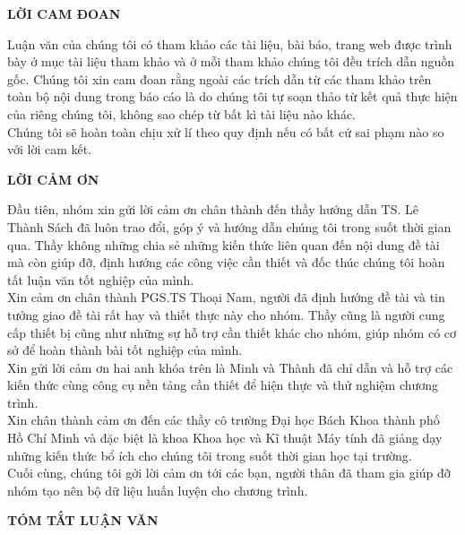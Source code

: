 \documentclass[a4paper]{report}
\begin{document}
\thispagestyle{empty}

\newpage
\begin{center}
	\textbf{LỜI CAM ĐOAN}
\end{center}

Luận văn của chúng tôi có tham khảo các tài liệu, bài báo, trang web được trình bày ở
mục tài liệu tham khảo và ở mỗi tham khảo chúng tôi đều trích dẫn nguồn gốc. Chúng tôi
xin cam đoan rằng ngoài các trích dẫn từ các tham khảo trên toàn bộ nội dung trong báo cáo
là do chúng tôi tự soạn thảo từ kết quả thực hiện của riêng chúng tôi, không sao chép từ
bất kì tài liệu nào khác.\\

Chúng tôi sẽ hoàn toàn chịu xử lí theo quy định nếu có bất cứ sai phạm nào so với lời
cam kết.

\newpage 
\begin{center}
	\textbf{LỜI CẢM ƠN}
\end{center}

Đầu tiên, nhóm xin gửi lời cảm ơn chân thành đến thầy hướng dẫn TS. Lê Thành Sách
đã luôn trao đổi, góp ý và hướng dẫn chúng tôi trong suốt thời gian qua. Thầy không những
chia sẻ những kiến thức liên quan đến nội dung đề tài mà còn giúp đỡ, định hướng các công 
việc cần thiết và đốc thúc chúng tôi hoàn tất luận văn tốt nghiệp của mình.\\

Xin cảm ơn chân thành PGS.TS Thoại Nam, người đã định hướng đề tài và tin tưởng giao đề 
tài rất hay và thiết thực này cho nhóm. Thầy cũng là người cung cấp thiết bị cũng như 
những sự hỗ trợ cần thiết khác cho nhóm, giúp nhóm có cơ sở để hoàn thành bài tốt nghiệp
 của mình. \\

Xin gửi lời cảm ơn hai anh khóa trên là Minh và Thành  đã chỉ dẫn và hỗ trợ các kiến thức
cùng công cụ nền tảng cần thiết để hiện thực và thử nghiệm chương trình.\\

Xin chân thành cảm ơn đến các thầy cô trường Đại học Bách Khoa thành phố Hồ Chí
Minh và đặc biệt là khoa Khoa học và Kĩ thuật Máy tính đã giảng dạy những kiến thức bổ
ích cho chúng tôi trong suốt thời gian học tại trường.\\

Cuối cùng, chúng tôi gởi lời cảm ơn tới các bạn, người thân đã tham gia giúp đỡ nhóm tạo
nên bộ dữ liệu huấn luyện cho chương trình.\\


\newpage
\begin{center}
	\textbf{TÓM TẮT LUẬN VĂN}
\end{center} 
\end{document}

